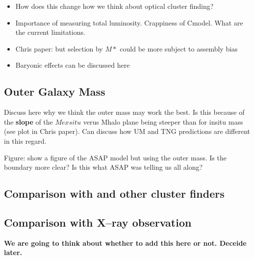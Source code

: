 \documentclass[a4paper,fleqn,usenatbib]{mnras}
\begin{document}
\begin{itemize}
    \item How does this change how we think about optical cluster finding?
    \item Importance of measuring total luminosity. Crappiness of Cmodel. What are the current limitations.
    \item Chris paper: but selection by $M*$ could be more subject to assembly bias
    \item Baryonic effects can be discussed here
\end{itemize}


\subsection{Outer Galaxy Mass}

Discuss here why we think the outer mass may work the best. Is this because of the \textbf{slope} of the $Mexsitu$ verus Mhalo plane being steeper than for insitu mass (see plot in Chris paper). Can discuss how UM and TNG predictions are different in this regard.

Figure: show a figure of the ASAP model but using the outer mass. Is the boundary more clear? Is this what ASAP was telling us all along?

\subsection{Comparison with \redm{} and other cluster finders}
    \label{sec:redmapper}

    
\subsection{Comparison with X--ray observation}
    \label{sec:xray}

\textbf{We are going to think about whether to add this here or not. Deceide later.}


\end{document}
